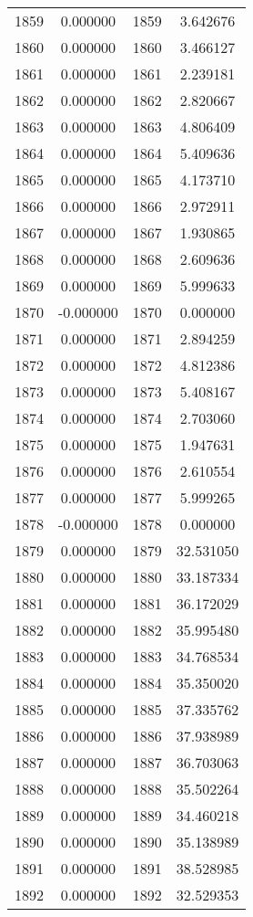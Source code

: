 \documentclass[12pt]{article}
\begin{document}
\begin{longtable}{@{}cccc@{}}
1859 & 0.000000 & 1859 & 3.642676 \\
1860 & 0.000000 & 1860 & 3.466127 \\
1861 & 0.000000 & 1861 & 2.239181 \\
1862 & 0.000000 & 1862 & 2.820667 \\
1863 & 0.000000 & 1863 & 4.806409 \\
1864 & 0.000000 & 1864 & 5.409636 \\
1865 & 0.000000 & 1865 & 4.173710 \\
1866 & 0.000000 & 1866 & 2.972911 \\
1867 & 0.000000 & 1867 & 1.930865 \\
1868 & 0.000000 & 1868 & 2.609636 \\
1869 & 0.000000 & 1869 & 5.999633 \\
1870 & -0.000000 & 1870 & 0.000000 \\
1871 & 0.000000 & 1871 & 2.894259 \\
1872 & 0.000000 & 1872 & 4.812386 \\
1873 & 0.000000 & 1873 & 5.408167 \\
1874 & 0.000000 & 1874 & 2.703060 \\
1875 & 0.000000 & 1875 & 1.947631 \\
1876 & 0.000000 & 1876 & 2.610554 \\
1877 & 0.000000 & 1877 & 5.999265 \\
1878 & -0.000000 & 1878 & 0.000000 \\
1879 & 0.000000 & 1879 & 32.531050 \\
1880 & 0.000000 & 1880 & 33.187334 \\
1881 & 0.000000 & 1881 & 36.172029 \\
1882 & 0.000000 & 1882 & 35.995480 \\
1883 & 0.000000 & 1883 & 34.768534 \\
1884 & 0.000000 & 1884 & 35.350020 \\
1885 & 0.000000 & 1885 & 37.335762 \\
1886 & 0.000000 & 1886 & 37.938989 \\
1887 & 0.000000 & 1887 & 36.703063 \\
1888 & 0.000000 & 1888 & 35.502264 \\
1889 & 0.000000 & 1889 & 34.460218 \\
1890 & 0.000000 & 1890 & 35.138989 \\
1891 & 0.000000 & 1891 & 38.528985 \\
1892 & 0.000000 & 1892 & 32.529353 \\

\end{longtable}
\end{document}
